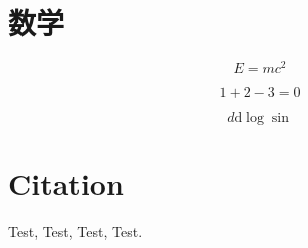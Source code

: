 \chapter{数学}

\begin{equation}
    E=mc^2
\end{equation}

\begin{equation}
1 + 2 - 3 = 0
\end{equation}

\begin{equation}
d\mathrm{d}\log \sin
\end{equation}


\chapter{Citation}

Test\cite{mittelbach04},
Test\cite{lamport94},
Test\cite{knuth86a,lamport94,mittelbach04},
Test\cite{刘海洋2013}.
